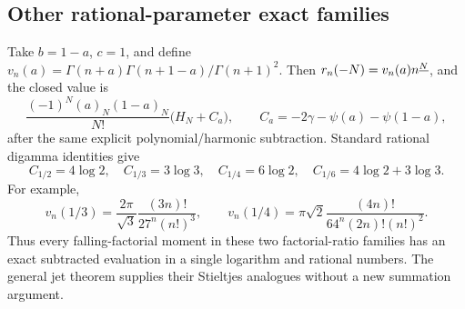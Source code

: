 \subsection{Other rational-parameter exact families}
Take $b=1-a$, $c=1$, and define
$v_n(a)=\Gamma(n+a)\Gamma(n+1-a)/\Gamma(n+1)^2$.
Then $r_n(-N)=v_n(a)n^{\underline{N}}$, and the closed value is
\begin{equation}\label{eq:complementfamily}
 \frac{(-1)^N(a)_N(1-a)_N}{N!}
 \bigl(H_N+C_a\bigr),\qquad
 C_a=-2\gamma-\psi(a)-\psi(1-a),
\end{equation}
after the same explicit polynomial/harmonic subtraction.
Standard rational digamma identities give
\[
 C_{1/2}=4\log2,\quad C_{1/3}=3\log3,\quad
 C_{1/4}=6\log2,\quad C_{1/6}=4\log2+3\log3.
\]
For example,
\[
 v_n(1/3)=\frac{2\pi}{\sqrt3}\frac{(3n)!}{27^n(n!)^3},
 \qquad
 v_n(1/4)=\pi\sqrt2\frac{(4n)!}{64^n(2n)!(n!)^2}.
\]
Thus every falling-factorial moment in these two factorial-ratio families
has an exact subtracted evaluation in a single logarithm and rational
numbers.  The general jet theorem supplies their Stieltjes analogues
without a new summation argument.
